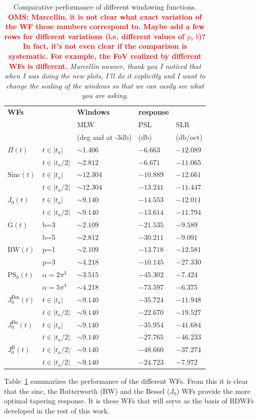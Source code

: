\documentclass[useAMS,usenatbib]{mn2e}
\newcommand{\OMS}[1]{\textcolor{red}{{\bf OMS: #1}}}
\begin{document}
\begin{table}
\begin{tabular}{|l||l|l|l|l|}
\hline
 \bf WFs& &\bf{Windows} & \bf response\\
 &&{ MLW} & { PSL}  & { SLR}   \\
  &&\hspace{-0.8cm}(deg and at -3db) & (db) & (db/oct)  \\
\hline\hline
{$\Pi(t)$}  & $t\in|t_a|$& $\sim 1.406$ &$-6.663$ &$-12.089$\\
	    & $t\in|t_a/2|$&$\sim 2.812$ &$-6.671$ &$-11.065$\\
\hline
{$\mathrm{Sinc}(t)$} & $t\in|t_a|$ &$\sim 12.304$& $-10.889$&  $-12.661$ \\
	 & $t\in|t_a/2|$ &$\sim 12.304$& $-13.241$&  $-11.447$ \\
\hline
{$J_0(t)$}& $t\in|t_a|$ &$\sim 9.140$ &$ -14.553$ & $ -12.011$\\
	  & $t\in|t_a/2|$ &$\sim 9.140$ &$ -13.614$ & $ -11.794$\\
\hline
{$\mathrm{G}(t)$} & b=3 &$\sim 2.109$& $-21.535$& $-9.589$\\ 
	 & b=5 &$\sim 2.812$& $-30.211$& $-9.091$\\ 
\hline
{$\mathrm{BW}(t)$} & p=1 &$\sim 2.109$ &$-13.718$ & $-12.581$\\
	  & p=3 &$\sim 4.218$ &$-10.145$ & $-27.330$\\
\hline
{$\mathrm{PS}_0(t)$} & $\alpha=2\pi^3$ &$\sim 3.515$& $-45.302$& $-7.424$\\ 
	 & $\alpha=5\pi^3$ &$\sim 4.218$& $-73.597$& $-6.375$\\ 
\hline
{$J_0^\mathrm{Hm}(t)$} & $t\in|t_a|$ &$\sim 9.140$&$-35.724$ & $-11.948$\\ 
 & $t\in|t_a/2|$ &$\sim 9.140$&$-22.670$&$-19.527$\\ 
\hline
{$J_0^\mathrm{Hn}(t)$}  & $t\in|t_a|$ &$\sim 9.140$&$-35.954$ &$-41.684$ \\ 
 &$t\in|t_a/2|$ &$\sim 9.140 $&$-27.765$&$-46.233$\\ 
\hline
{$J_0^\mathrm{B}(t)$} & $t\in|t_a/2|$ &$\sim 9.140$&$-48.660$&$-37.274$\\ 
 & $t\in|t_a/2|$ &$\sim 9.140$&$-24.723$&$-7.972$
\end{tabular}
\caption{\label{tab:WF:performance}Comparative performance of 
different windowing functions. 
\OMS{Marcellin, it is not clear what exact variation of the
WF these numbers correspond to. Maybe add a few rows for different variations (i.e. different values
of $p$, $b$)? In fact, it's not even clear if the comparison is systematic. For example, the FoV realized 
by different WFs is different.}
\emph{ Marcellin anwser, thank you I noticed that when I was doing the new plots, I'll do it explicitly and 
I want to change the scaling of the windows so that we can easily see what you are asking.}}
\end{table}
Table~\ref{tab:WF:performance} summarizes the performance of the different WFs. From this it is clear that
the sinc, the Butterworth (BW) and the Bessel ($J_0$) WFs provide the more optimal tapering response. It is these WFs that
will serve as the basis of BDWFs developed in the rest of this work. 
\end{document}
